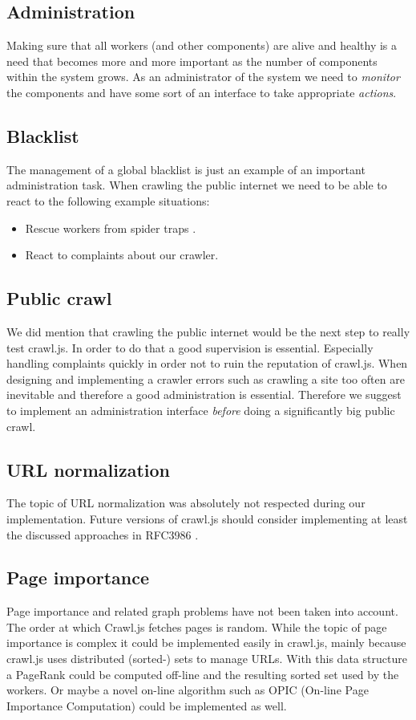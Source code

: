 \subsection{Administration}
Making sure that all workers (and other components) are alive and healthy is a need that becomes more and more important as the number of components within the system grows. As an administrator of the system we need to \emph{monitor} the components and have some sort of an interface to take appropriate \emph{actions}.

\subsection{Blacklist}
The management of a global blacklist is just an example of an important administration task. When crawling the public internet we need to be able to react to the following example situations:
\begin{itemize}
  \item Rescue workers from spider traps \cite{wiki:spider_trap}.
  \item React to complaints about our crawler.
\end{itemize}

\subsection{Public crawl}
We did mention that crawling the public internet would be the next step to really test crawl.js. In order to do that a good supervision is essential. Especially handling complaints quickly in order not to ruin the reputation of crawl.js. When designing and implementing a crawler errors such as crawling a site too often are inevitable and therefore a good administration is essential. Therefore we suggest to implement an administration interface \emph{before} doing a significantly big public crawl.

\subsection{URL normalization}
The topic of URL normalization \cite{wiki:url_normalization} was absolutely not respected during our implementation. Future versions of crawl.js should consider implementing at least the discussed approaches in RFC3986 \cite{rfc:url_normalization}.

\subsection{Page importance}
Page importance and related graph problems have not been taken into account. The order at which Crawl.js fetches pages is random. While the topic of page importance is complex it could be implemented easily in crawl.js, mainly because crawl.js uses distributed (sorted-) sets to manage URLs. With this data structure a PageRank\cite{google} could be computed off-line and the resulting sorted set used by the workers. Or maybe a novel on-line algorithm such as OPIC (On-line Page Importance Computation) \cite{page_importance1} could be implemented as well.
